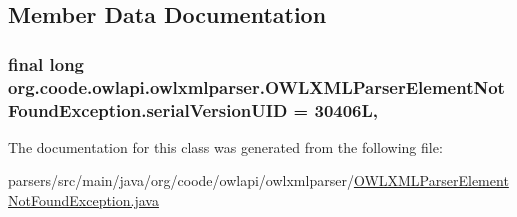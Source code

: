 \subsection{Member Data Documentation}
\hypertarget{classorg_1_1coode_1_1owlapi_1_1owlxmlparser_1_1_o_w_l_x_m_l_parser_element_not_found_exception_a97891b1efb7671df81fa9862375949f7}{
\subsubsection[{serial\-Version\-U\-I\-D}]{\setlength{\rightskip}{0pt plus 5cm}final long org.\-coode.\-owlapi.\-owlxmlparser.\-O\-W\-L\-X\-M\-L\-Parser\-Element\-Not\-Found\-Exception.\-serial\-Version\-U\-I\-D = 30406\-L\hspace{0.3cm}{\ttfamily [static]}, {\ttfamily [private]}}}\label{classorg_1_1coode_1_1owlapi_1_1owlxmlparser_1_1_o_w_l_x_m_l_parser_element_not_found_exception_a97891b1efb7671df81fa9862375949f7}


The documentation for this class was generated from the following file\-:\begin{DoxyCompactItemize}
\item 
parsers/src/main/java/org/coode/owlapi/owlxmlparser/\hyperlink{_o_w_l_x_m_l_parser_element_not_found_exception_8java}{O\-W\-L\-X\-M\-L\-Parser\-Element\-Not\-Found\-Exception.\-java}\end{DoxyCompactItemize}
